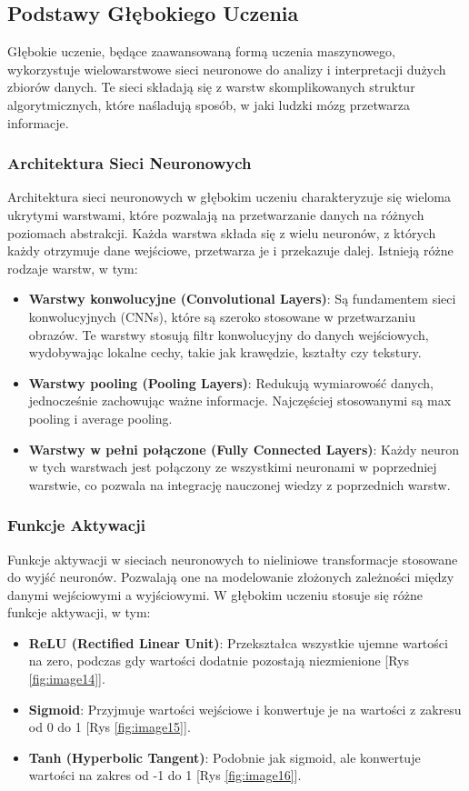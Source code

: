\subsection*{Podstawy Głębokiego Uczenia}
Głębokie uczenie, będące zaawansowaną formą uczenia maszynowego, wykorzystuje wielowarstwowe sieci neuronowe do analizy i interpretacji dużych zbiorów danych. Te sieci składają się z warstw skomplikowanych struktur algorytmicznych, które naśladują sposób, w jaki ludzki mózg przetwarza informacje.


\subsubsection*{Architektura Sieci Neuronowych}
Architektura sieci neuronowych w głębokim uczeniu charakteryzuje się wieloma ukrytymi warstwami, które pozwalają na przetwarzanie danych na różnych poziomach abstrakcji. Każda warstwa składa się z wielu neuronów, z których każdy otrzymuje dane wejściowe, przetwarza je i przekazuje dalej. Istnieją różne rodzaje warstw, w tym:
\begin{itemize}
    \item \textbf{Warstwy konwolucyjne (Convolutional Layers)}: Są fundamentem sieci konwolucyjnych (CNNs), które są szeroko stosowane w przetwarzaniu obrazów. Te warstwy stosują filtr konwolucyjny do danych wejściowych, wydobywając lokalne cechy, takie jak krawędzie, kształty czy tekstury.
    \item \textbf{Warstwy pooling (Pooling Layers)}: Redukują wymiarowość danych, jednocześnie zachowując ważne informacje. Najczęściej stosowanymi są max pooling i average pooling.
    \item \textbf{Warstwy w pełni połączone (Fully Connected Layers)}: Każdy neuron w tych warstwach jest połączony ze wszystkimi neuronami w poprzedniej warstwie, co pozwala na integrację nauczonej wiedzy z poprzednich warstw.
\end{itemize}


\subsubsection*{Funkcje Aktywacji}
Funkcje aktywacji w sieciach neuronowych to nieliniowe transformacje stosowane do wyjść neuronów. Pozwalają one na modelowanie złożonych zależności między danymi wejściowymi a wyjściowymi. W głębokim uczeniu stosuje się różne funkcje aktywacji, w tym:
\begin{itemize}
    \item \textbf{ReLU (Rectified Linear Unit)}: Przekształca wszystkie ujemne wartości na zero, podczas gdy wartości dodatnie pozostają niezmienione  [Rys \ref{fig:image14}].
    \item \textbf{Sigmoid}: Przyjmuje wartości wejściowe i konwertuje je na wartości z zakresu od 0 do 1 [Rys \ref{fig:image15}].
    \item \textbf{Tanh (Hyperbolic Tangent)}: Podobnie jak sigmoid, ale konwertuje wartości na zakres od -1 do 1 [Rys \ref{fig:image16}].
\end{itemize}

